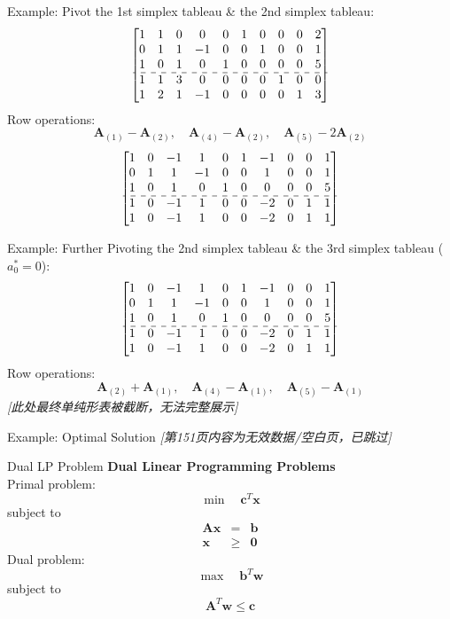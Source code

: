 \documentclass[aspectratio=169,hyperref,UTF8,CJK]{beamer}
\begin{document}
\begin{frame}{Example: Pivot}
the 1st simplex tableau \& the 2nd simplex tableau:
\[
\begin{bmatrix}
1 & 1 & 0 & 0 & 0 & 1 & 0 & 0 & 0 & 2 \\
0 & 1 & 1 & -1 & 0 & 0 & 1 & 0 & 0 & 1 \\
1 & 0 & 1 & 0 & 1 & 0 & 0 & 0 & 0 & 5 \\
\hdashline 1 & 1 & 3 & 0 & 0 & 0 & 0 & 1 & 0 & 0 \\
1 & 2 & 1 & -1 & 0 & 0 & 0 & 0 & 1 & 3
\end{bmatrix}
\]
Row operations:
\[
\mathbf{A}_{(1)} - \mathbf{A}_{(2)}, \quad \mathbf{A}_{(4)} - \mathbf{A}_{(2)}, \quad \mathbf{A}_{(5)} - 2\mathbf{A}_{(2)}
\]
\[
\begin{bmatrix}
1 & 0 & -1 & 1 & 0 & 1 & -1 & 0 & 0 & 1 \\
0 & 1 & 1 & -1 & 0 & 0 & 1 & 0 & 0 & 1 \\
1 & 0 & 1 & 0 & 1 & 0 & 0 & 0 & 0 & 5 \\
\hdashline 1 & 0 & -1 & 1 & 0 & 0 & -2 & 0 & 1 & 1 \\
1 & 0 & -1 & 1 & 0 & 0 & -2 & 0 & 1 & 1
\end{bmatrix}
\]
\end{frame}

\begin{frame}{Example: Further Pivoting}
the 2nd simplex tableau \& the 3rd simplex tableau (\(a_0^* = 0\)):
\[
\begin{bmatrix}
1 & 0 & -1 & 1 & 0 & 1 & -1 & 0 & 0 & 1 \\
0 & 1 & 1 & -1 & 0 & 0 & 1 & 0 & 0 & 1 \\
1 & 0 & 1 & 0 & 1 & 0 & 0 & 0 & 0 & 5 \\
\hdashline 1 & 0 & -1 & 1 & 0 & 0 & -2 & 0 & 1 & 1 \\
1 & 0 & -1 & 1 & 0 & 0 & -2 & 0 & 1 & 1
\end{bmatrix}
\]
Row operations:
\[
\mathbf{A}_{(2)} + \mathbf{A}_{(1)}, \quad \mathbf{A}_{(4)} - \mathbf{A}_{(1)}, \quad \mathbf{A}_{(5)} - \mathbf{A}_{(1)}
\]
\textit{[此处最终单纯形表被截断，无法完整展示]}
\end{frame}

\begin{frame}{Example: Optimal Solution}
\textit{[第151页内容为无效数据/空白页，已跳过]}
\end{frame}

\begin{frame}{Dual LP Problem}
\textbf{Dual Linear Programming Problems} \\
Primal problem:
\[
\min \quad \mathbf{c}^T \mathbf{x}
\]
subject to
\[
\begin{array}{rcl} \mathbf{A}\mathbf{x} & = & \mathbf{b} \\ \mathbf{x} & \geq & \mathbf{0} \end{array}
\]
Dual problem:
\[
\max \quad \mathbf{b}^T \mathbf{w}
\]
subject to
\[
\mathbf{A}^T \mathbf{w} \leq \mathbf{c}
\]
\end{frame}
\end{document}
